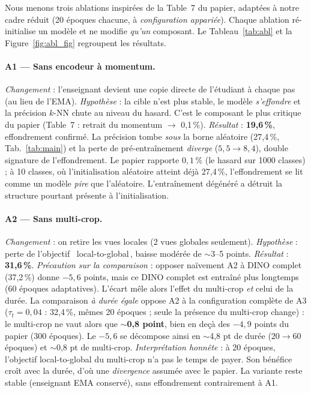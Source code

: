 \documentclass[11pt,a4paper]{article}
\begin{document}
Nous menons trois ablations inspirées de la Table~7 du papier, adaptées à notre cadre réduit
(20 époques chacune, à \emph{configuration appariée}). Chaque ablation ré-initialise un modèle et ne
modifie \emph{qu'un} composant. Le Tableau~\ref{tab:abl} et la Figure~\ref{fig:abl_fig} regroupent
les résultats.

\paragraph{A1 --- Sans encodeur à momentum.} \emph{Changement} : l'enseignant devient une copie
directe de l'étudiant à chaque pas (au lieu de l'EMA). \emph{Hypothèse} : la cible n'est plus
stable, le modèle \emph{s'effondre} et la précision $k$-NN chute au niveau du hasard. C'est le
composant le plus critique du papier (Table~7 : retrait du momentum $\rightarrow$ 0,1\,\%).
\emph{Résultat} : \textbf{19,6\,\%}, effondrement confirmé. La précision tombe \emph{sous} la
borne aléatoire (27,4\,\%, Tab.~\ref{tab:main}) et la perte de pré-entraînement \emph{diverge}
($5{,}5\to8{,}4$), double signature de l'effondrement. Le papier rapporte $0{,}1\,\%$ (le hasard
sur 1000 classes) ; à 10 classes, où l'initialisation aléatoire atteint déjà 27,4\,\%,
l'effondrement se lit comme un modèle \emph{pire} que l'aléatoire. L'entraînement dégénéré a
détruit la structure pourtant présente à l'initialisation.

\paragraph{A2 --- Sans multi-crop.} \emph{Changement} : on retire les vues locales (2 vues
globales seulement). \emph{Hypothèse} : perte de l'objectif \guillemotleft\ local-to-global\,\guillemotright{}, baisse modérée
de $\sim$3--5 points. \emph{Résultat} : \textbf{31,6\,\%}. \emph{Précaution sur la comparaison} :
opposer naïvement A2 à DINO complet (37,2\,\%) donne $-5{,}6$ points, mais ce DINO complet est
entraîné plus longtemps (60 époques adaptatives). L'écart mêle alors l'effet du multi-crop
\emph{et} celui de la durée. La comparaison \emph{à durée égale} oppose A2 à la configuration
complète de A3 ($\tau_t{=}0{,}04$ : 32,4\,\%, mêmes 20 époques ; seule la présence du multi-crop
change) : le multi-crop ne vaut alors que \textbf{$\sim$0,8 point}, bien en deçà des $-4{,}9$ points
du papier (300 époques). Le $-5{,}6$ se décompose ainsi en $\sim$4,8 pt de durée (20$\to$60 époques)
et $\sim$0,8 pt de multi-crop. \emph{Interprétation honnête} : à 20 époques, l'objectif
local-to-global du multi-crop n'a pas le temps de payer. Son bénéfice croît avec la durée,
d'où une \emph{divergence} assumée avec le papier. La variante reste stable (enseignant EMA
conservé), sans effondrement contrairement à A1.
\end{document}
